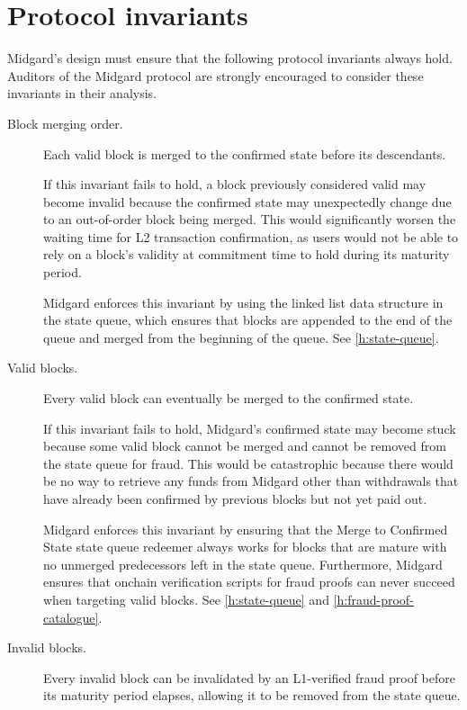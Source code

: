 \documentclass[../midgard.tex]{subfiles}
\begin{document}
\section{Protocol invariants}
\label{h:protocol-invariants}

Midgard's design must ensure that the following protocol invariants always hold.
Auditors of the Midgard protocol are strongly encouraged to consider these invariants in their analysis.
\begin{description}
  \item[Block merging order.] Each valid block is merged to the confirmed state before its descendants.

    If this invariant fails to hold, a block previously considered valid may become invalid because the confirmed state may unexpectedly change due to an out-of-order block being merged.
    This would significantly worsen the waiting time for L2 transaction confirmation, as users would not be able to rely on a block's validity at commitment time to hold during its maturity period.

    Midgard enforces this invariant by using the linked list data structure in the state queue, which ensures that blocks are appended to the end of the queue and merged from the beginning of the queue.
    See \cref{h:state-queue}.

  \item[Valid blocks.] Every valid block can eventually be merged to the confirmed state.

    If this invariant fails to hold, Midgard's confirmed state may become stuck because some valid block cannot be merged and cannot be removed from the state queue for fraud.
    This would be catastrophic because there would be no way to retrieve any funds from Midgard other than withdrawals that have already been confirmed by previous blocks but not yet paid out.

    Midgard enforces this invariant by ensuring that the Merge to Confirmed State state queue redeemer always works for blocks that are mature with no unmerged predecessors left in the state queue.
    Furthermore, Midgard ensures that onchain verification scripts for fraud proofs can never succeed when targeting valid blocks.
    See \cref{h:state-queue} and \cref{h:fraud-proof-catalogue}.

  \item[Invalid blocks.] Every invalid block can be invalidated by an L1-verified fraud proof before its maturity period elapses, allowing it to be removed from the state queue.


\end{description}
\end{document}

